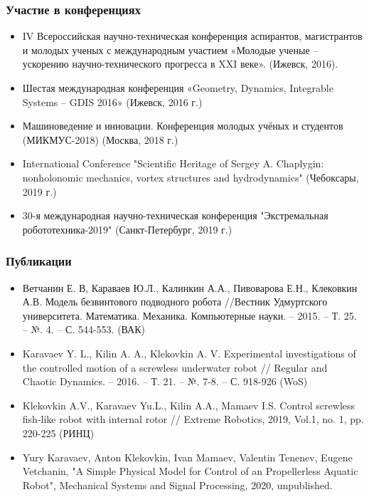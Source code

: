 \begin{frame}
    \frametitle{Участие в конференциях}
    \begin{itemize}
    	\item IV Всероссийская научно-техническая конференция аспирантов, магистрантов и молодых ученых с международным участием «Молодые ученые -- ускорению научно-технического прогресса в XXI веке». (Ижевск, 2016).
    	\item Шестая международная конференция «Geometry, Dynamics, Integrable Systems -- GDIS 2016» (Ижевск, 2016 г.)
    	\item Машиноведение и инновации. Конференция молодых учёных и студентов (МИКМУС-2018) (Москва, 2018 г.)
    	\item International Conference "Scientific Heritage of Sergey A. Chaplygin: nonholonomic mechanics, vortex structures and hydrodynamics" (Чебоксары, 2019 г.)
    	\item 30-я международная научно-техническая конференция "Экстремальная робототехника-2019" (Санкт-Петербург, 2019 г.)	
    \end{itemize}
\end{frame}

\begin{frame}
\frametitle{Публикации}
\begin{itemize}
	
	\item Ветчанин Е. В, Караваев Ю.Л., Калинкин А.А., Пивоварова Е.Н., Клековкин А.В. Модель безвинтового подводного робота //Вестник Удмуртского университета. Математика. Механика. Компьютерные науки. – 2015. – Т. 25. – №. 4. – С. 544-553. (ВАК)
	
	\item Karavaev Y. L., Kilin A. A., Klekovkin A. V. Experimental investigations of the controlled motion of a screwless underwater robot // Regular and Chaotic Dynamics. – 2016. – Т. 21. – №. 7-8. – С. 918-926 (WoS)
	
	\item Klekovkin A.V., Karavaev Yu.L., Kilin A.A., Mamaev I.S. Control screwless fish-like robot with internal rotor // Extreme Robotics,  2019, Vol.1, no. 1, pp. 220-225 (РИНЦ)
	
	\item Yury Karavaev, Anton Klekovkin, Ivan Mamaev, Valentin Tenenev, Eugene Vetchanin, "A Simple Physical Model for Control of an Propellerless Aquatic Robot",  Mechanical Systems and Signal Processing, 2020, unpublished.
		
\end{itemize}
\end{frame}

